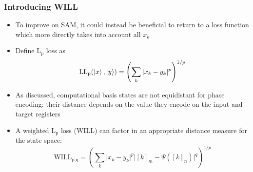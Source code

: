 \documentclass{beamer}
\begin{document}
\begin{frame}
\frametitle{Introducing WILL}
\begin{itemize}
\item To improve on SAM, it could instead be beneficial to return to a loss function which more directly takes into account all $x_k$ 
\item Define \alert{L$_\text{p}$ loss} as 
\begin{equation}
\text{LL}_\text{p} (\ket{x}, \ket{y}) = \left( \sum_k |x_k -y_k|^p \right)^{1/p}
\end{equation}
\item As discussed, \alert{computational basis states are not equidistant} for phase encoding: their distance depends on the value they encode on the input and target registers
\item A \alert{weighted L$_\text{p}$ loss (WILL)} can factor in an appropriate distance measure for the state space:
\begin{equation}
\text{WILL}_\text{p,q} =  \left( \sum_k \Big|x_k -y_k \Big|^p \Big|[k]_m - \Psi([k]_n) \Big|^q \right)^{1/p}
\end{equation}
\end{itemize}
\end{frame}
\end{document}
